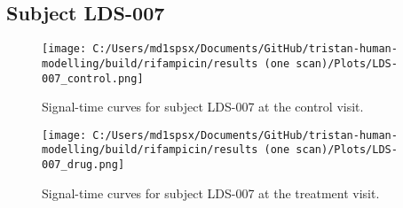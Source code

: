 \documentclass{epflreport}%
\begin{document}
\subsection{Subject LDS{-}007}%
\label{subsec:SubjectLDS{-}007}%

%


\begin{figure}[h!]%
\centering%
\texttt{[image: C:/Users/md1spsx/Documents/GitHub/tristan-human-modelling/build/rifampicin/results (one scan)/Plots/LDS-007\_control.png]}%
\caption{Signal{-}time curves for subject LDS{-}007 at the control visit.}%
\end{figure}

%


\begin{figure}[h!]%
\centering%
\texttt{[image: C:/Users/md1spsx/Documents/GitHub/tristan-human-modelling/build/rifampicin/results (one scan)/Plots/LDS-007\_drug.png]}%
\caption{Signal{-}time curves for subject LDS{-}007 at the treatment visit.}%
\end{figure}
\end{document}
